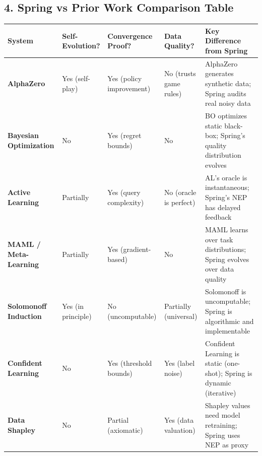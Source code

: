 \documentclass[
  12pt,
]{article}
\begin{document}
\subsection{4. Spring vs Prior Work Comparison Table}\label{spring-vs-prior-work}

\begin{longtable}[]{@{}
  >{\raggedright\arraybackslash}p{}
  >{\raggedright\arraybackslash}p{}
  >{\raggedright\arraybackslash}p{}
  >{\raggedright\arraybackslash}p{}
  >{\raggedright\arraybackslash}p{}@{}}
\toprule\noalign{}
\begin{minipage}[b]{\linewidth}\raggedright
System
\end{minipage} & \begin{minipage}[b]{\linewidth}\raggedright
Self-Evolution?
\end{minipage} & \begin{minipage}[b]{\linewidth}\raggedright
Convergence Proof?
\end{minipage} & \begin{minipage}[b]{\linewidth}\raggedright
Data Quality?
\end{minipage} & \begin{minipage}[b]{\linewidth}\raggedright
Key Difference from Spring
\end{minipage} \\
\midrule\noalign{}
\endhead
\bottomrule\noalign{}
\endlastfoot
\textbf{AlphaZero} & Yes (self-play) & Yes (policy improvement) & No (trusts game rules) & AlphaZero generates synthetic data; Spring audits real noisy data \\
\textbf{Bayesian Optimization} & No & Yes (regret bounds) & No & BO optimizes static black-box; Spring's quality distribution evolves \\
\textbf{Active Learning} & Partially & Yes (query complexity) & No (oracle is perfect) & AL's oracle is instantaneous; Spring's NEP has delayed feedback \\
\textbf{MAML / Meta-Learning} & Partially & Yes (gradient-based) & No & MAML learns over task distributions; Spring evolves over data quality \\
\textbf{Solomonoff Induction} & Yes (in principle) & No (uncomputable) & Partially (universal) & Solomonoff is uncomputable; Spring is algorithmic and implementable \\
\textbf{Confident Learning} & No & Yes (threshold bounds) & Yes (label noise) & Confident Learning is static (one-shot); Spring is dynamic (iterative) \\
\textbf{Data Shapley} & No & Partial (axiomatic) & Yes (data valuation) & Shapley values need model retraining; Spring uses NEP as proxy \\
\end{longtable}
\end{document}
